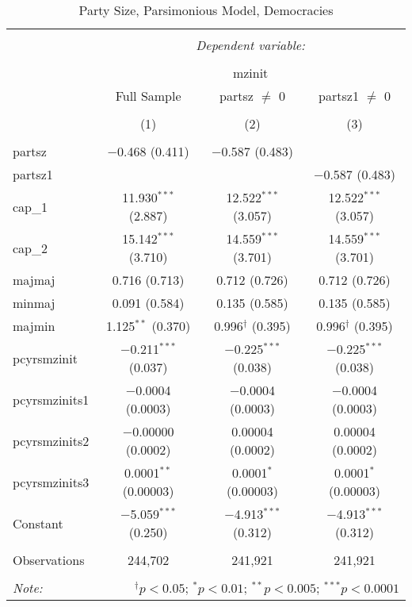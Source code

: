 
\begin{table}[!htbp] \centering 
  \caption{Party Size, Parsimonious Model, Democracies} 
  \label{} 
\begin{tabular}{@{\extracolsep{5pt}}lccc} 
\\[-1.8ex]\hline 
\hline \\[-1.8ex] 
 & \multicolumn{3}{c}{\textit{Dependent variable:}} \\ 
\cline{2-4} 
\\[-1.8ex] & \multicolumn{3}{c}{mzinit} \\ 
 & Full Sample & partsz $\neq$ 0 & partsz1 $\neq$ 0 \\ 
\\[-1.8ex] & (1) & (2) & (3)\\ 
\hline \\[-1.8ex] 
 partsz & $-$0.468 (0.411) & $-$0.587 (0.483) &  \\ 
  partsz1 &  &  & $-$0.587 (0.483) \\ 
  cap\_1 & 11.930$^{***}$ (2.887) & 12.522$^{***}$ (3.057) & 12.522$^{***}$ (3.057) \\ 
  cap\_2 & 15.142$^{***}$ (3.710) & 14.559$^{***}$ (3.701) & 14.559$^{***}$ (3.701) \\ 
  majmaj & 0.716 (0.713) & 0.712 (0.726) & 0.712 (0.726) \\ 
  minmaj & 0.091 (0.584) & 0.135 (0.585) & 0.135 (0.585) \\ 
  majmin & 1.125$^{**}$ (0.370) & 0.996$^{\dagger}$ (0.395) & 0.996$^{\dagger}$ (0.395) \\ 
  pcyrsmzinit & $-$0.211$^{***}$ (0.037) & $-$0.225$^{***}$ (0.038) & $-$0.225$^{***}$ (0.038) \\ 
  pcyrsmzinits1 & $-$0.0004 (0.0003) & $-$0.0004 (0.0003) & $-$0.0004 (0.0003) \\ 
  pcyrsmzinits2 & $-$0.00000 (0.0002) & 0.00004 (0.0002) & 0.00004 (0.0002) \\ 
  pcyrsmzinits3 & 0.0001$^{**}$ (0.00003) & 0.0001$^{*}$ (0.00003) & 0.0001$^{*}$ (0.00003) \\ 
  Constant & $-$5.059$^{***}$ (0.250) & $-$4.913$^{***}$ (0.312) & $-$4.913$^{***}$ (0.312) \\ 
 \hline \\[-1.8ex] 
Observations & 244,702 & 241,921 & 241,921 \\ 
\hline 
\hline \\[-1.8ex] 
\textit{Note:}  & \multicolumn{3}{r}{$^{\dagger} p<0.05$; $^{*} p<0.01$; $^{**} p<0.005$; $^{***} p<0.0001$} \\ 
\end{tabular} 
\end{table} 
